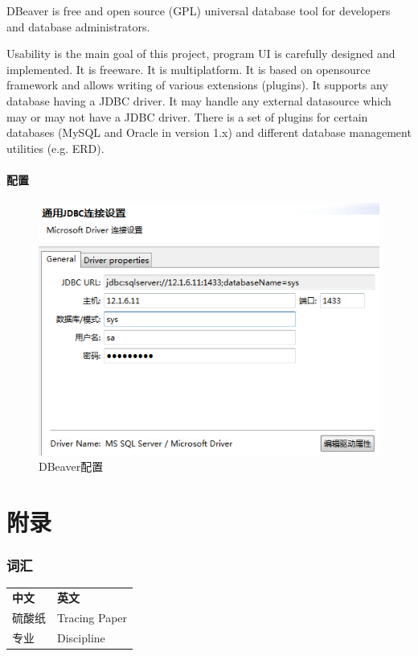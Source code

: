\documentclass[paper=a4,fontsize=11pt]{article}
\begin{document}
	DBeaver is free and open source (GPL) universal database tool for developers and database administrators.
	
	Usability is the main goal of this project, program UI is carefully designed and implemented.
	It is freeware.
	It is multiplatform.
	It is based on opensource framework and allows writing of various extensions (plugins).
	It supports any database having a JDBC driver.
	It may handle any external datasource which may or may not have a JDBC driver.
	There is a set of plugins for certain databases (MySQL and Oracle in version 1.x) and different database management utilities (e.g. ERD).
	
	\subsection{配置}
	
	\begin{figure}[htbp]
		\centering
		\includegraphics[scale=0.8]{JDBCConnectionConfig.jpg}
		\caption{DBeaver配置}
		\label{JDBCConnectionConfig}
	\end{figure}
	
	
	\clearpage
	\part{附录}
	\clearpage
	\section{词汇}
	\begin{tabular}{ll}			
		\multirow{1}{*}{\textbf{中文}}			
		& \multicolumn{1}{l}{\textbf{英文}}\\			
		硫酸纸 & Tracing Paper\\
		专业 & Discipline\footnotemark[1]\\
	\end{tabular}
	\clearpage	
\end{document}
